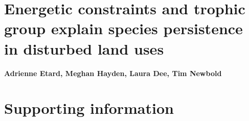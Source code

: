 \documentclass[11pt]{report}
\begin{document}
\chapter*{Energetic constraints and trophic group explain species persistence in disturbed land uses}

\textbf{Adrienne Etard, Meghan Hayden, Laura Dee, Tim Newbold
}
\label{sec:5}


\chapter*{Supporting information}
\setcounter{section}{0}
\setcounter{figure}{0}
\setcounter{table}{0}
\renewcommand{\thefigure}{S5.\arabic{figure}}
\renewcommand{\thetable}{S5.\arabic{table}}
\renewcommand{\thesection}{S5.\arabic{section}}

\printbibliography[title={Bibliography}]
\end{document}
